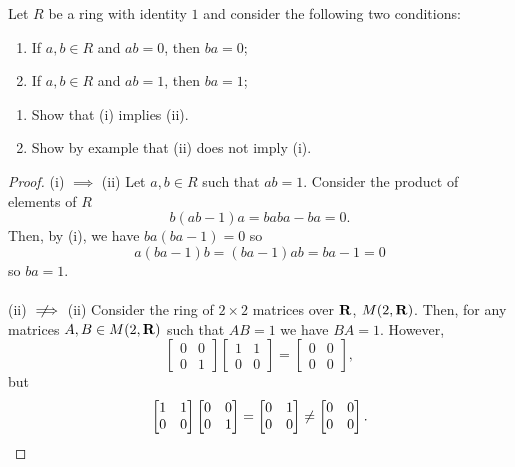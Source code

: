 \begin{problem}
Let $R$ be a ring with identity $1$ and consider the following two
conditions:
\begin{center}
\begin{enumerate}[label=(\roman*)]
\item If $a,b\in R$ and $ab=0$, then $ba=0$;
\item If $a,b\in R$ and $ab=1$, then $ba=1$;
\end{enumerate}
\end{center}
\begin{enumerate}[label=(\alph*)]
\item Show that (i) implies (ii).
\item Show by example that (ii) does not imply (i).
\end{enumerate}
\end{problem}
\begin{proof}
(i) $\implies$ (ii) Let $a,b\in R$ such that $ab=1$. Consider the product
of elements of $R$
\[
b(ab-1)a=baba-ba=0.
\]
Then, by (i), we have $ba(ba-1)=0$ so
\[
a(ba-1)b=(ba-1)ab=ba-1=0
\]
so $ba=1$.
\\\\
(ii) $\nimplies$ (ii) Consider the ring of $2\times 2$ matrices over
$\mathbf{R}$, $M(2,\mathbf{R})$. Then, for any matrices $A,B\in M(2,\mathbf{R})$ such that
$AB=1$ we have $BA=1$. However,
\[
\begin{bmatrix}
0&0\\
0&1
\end{bmatrix}
\begin{bmatrix}
1&1\\
0&0
\end{bmatrix}
=
\begin{bmatrix}
0&0\\
0&0
\end{bmatrix},
\]
but
\[
\begin{bmatrix}
1&1\\
0&0
\end{bmatrix}
\begin{bmatrix}
0&0\\
0&1
\end{bmatrix}
=
\begin{bmatrix}
0&1\\
0&0
\end{bmatrix}
\neq
\begin{bmatrix}
0&0\\
0&0
\end{bmatrix}.
\qedhere
\]
\end{proof}

